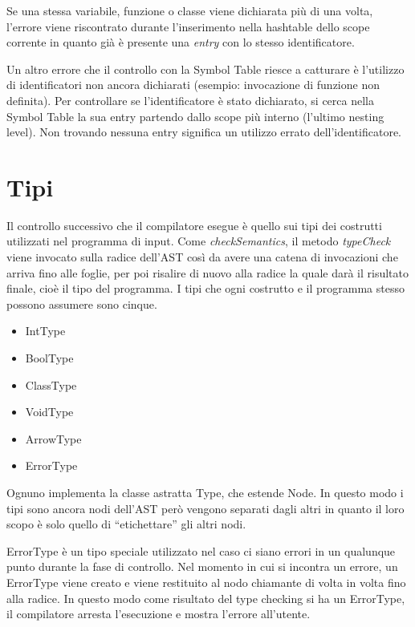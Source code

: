 \documentclass{scrreprt}
\begin{document}
Se una stessa variabile, funzione o classe viene dichiarata più di una volta, l'errore viene riscontrato durante l'inserimento
nella hashtable dello scope corrente in quanto già è presente una \textit{entry} con lo stesso identificatore. 

Un altro errore che il controllo con la Symbol Table riesce a catturare è l'utilizzo di identificatori non ancora dichiarati (esempio: invocazione di funzione non definita). 
Per controllare se l'identificatore è stato dichiarato, si cerca nella Symbol Table la sua entry partendo dallo scope più interno (l'ultimo nesting level). Non trovando nessuna entry
significa un utilizzo errato dell'identificatore.

\section{Tipi}
Il controllo successivo che il compilatore esegue è quello sui tipi dei costrutti utilizzati nel programma di input. Come \textit{checkSemantics}, il metodo \textit{typeCheck} viene invocato sulla
radice dell'AST così da avere una catena di invocazioni che arriva fino alle foglie, per poi risalire di nuovo alla radice la quale darà il risultato finale, cioè il tipo del programma. 
I tipi che ogni costrutto e il programma stesso possono assumere sono cinque.

\begin{itemize}
    \item IntType
    \item BoolType
    \item ClassType
    \item VoidType
    \item ArrowType
    \item ErrorType
\end{itemize}

Ognuno implementa la classe astratta Type, che estende Node. In questo modo i tipi sono ancora nodi dell'AST però vengono separati dagli altri in quanto il loro scopo è solo quello
di ``etichettare'' gli altri nodi.

ErrorType è un tipo speciale utilizzato nel caso ci siano errori in un qualunque punto durante la fase di controllo. Nel momento in cui si incontra un errore,
un ErrorType viene creato e viene restituito al nodo chiamante di volta in volta fino alla radice. In questo modo come risultato del type checking si ha un ErrorType, il compilatore
arresta l'esecuzione e mostra l'errore all'utente.
\end{document}
